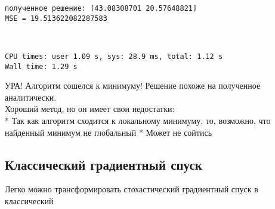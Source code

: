 \documentclass[11pt]{article}
\begin{document}
    \begin{Verbatim}[commandchars=\\\{\}]
полученное решение: [43.08308701 20.57648821]
MSE = 19.513622082287583
    \end{Verbatim}

    \begin{center}
    \end{center}
    { \hspace*{\fill} \\}
    
    \begin{Verbatim}[commandchars=\\\{\}]
CPU times: user 1.09 s, sys: 28.9 ms, total: 1.12 s
Wall time: 1.29 s
    \end{Verbatim}

    УРА! Алгоритм сошелся к минимуму! Решение похоже на полученное
аналитически.\\
Хороший метод, но он имеет свои недостатки:\\
* Так как алгоритм сходится к локальному минимуму, то, возможно, что
найденный минимум не глобальный * Может не сойтись

    \hypertarget{ux43aux43bux430ux441ux441ux438ux447ux435ux441ux43aux438ux439-ux433ux440ux430ux434ux438ux435ux43dux442ux43dux44bux439-ux441ux43fux443ux441ux43a}{%
\subsection{Классический градиентный
спуск}\label{ux43aux43bux430ux441ux441ux438ux447ux435ux441ux43aux438ux439-ux433ux440ux430ux434ux438ux435ux43dux442ux43dux44bux439-ux441ux43fux443ux441ux43a}}

Легко можно трансформировать стохастический градиентный спуск в
классический
\end{document}
